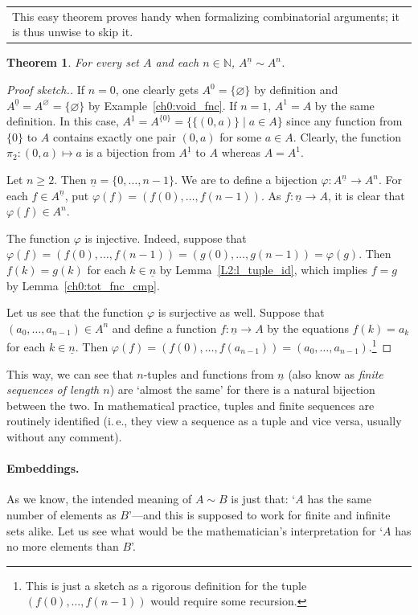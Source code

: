 \documentclass[12pt,notitlepage]{article}
\theoremstyle{plain}
\newtheorem{thm}{Theorem}[section]
\theoremstyle{definition}
\theoremstyle{plain}
\newcommand{\N}{\mathbb{N}}
\newcommand{\void}{\varnothing}
\renewcommand{\phi}{\varphi}
\newcommand{\ul}[1]{\underline{#1}}
\newcommand{\1}{\mathbf{1}}
\newcommand{\0}{\mathbf{0}}
\newcommand{\mcomm}[1]{
\medskip\noindent\begin{tabular}{| l}
\parbox{0.99\textwidth}{{\small
#1 }}\end{tabular}
\smallskip}
\begin{document}
\mcomm{This easy theorem proves handy when formalizing combinatorial arguments; it is thus unwise to skip it.}
\begin{thm}\label{L9:t_tuples}
For every set $A$ and each $n \in \N$, $A^{\ul{n}} \sim A^n$.
\end{thm}
\begin{proof}[Proof sketch.]
If $n = 0$, one clearly gets $A^0 = \{ \void \}$ by definition and $A^{\ul{0}} = A^\void = \{ \void \}$ by Example~\ref{ch0:void_fnc}. If $n = 1$, $A^1 = A$ by the same definition. In this case, $A^{\ul{1}} = A^{\{0\}} = \{ \{ (0, a) \} \mid a \in A\}$ since any function from $\{ 0 \}$ to $A$ contains exactly one pair $(0, a)$ for some $a \in A$. Clearly, the function $\pi_2 \colon (0, a) \mapsto a$ is a bijection from $A^{\ul{1}}$ to $A$ whereas $A = A^1$.

Let $n \ge 2$. Then $\ul{n} = \{0, \ldots, n-1 \}$. We are to define a bijection $\phi \colon A^{\ul{n}} \to A^n$. For each $f \in A^{\ul{n}}$, put $\phi(f) = (f(0), \ldots, f(n - 1))$. As $f\colon \ul{n} \to A$, it is clear that $\phi(f) \in A^n$. 

The function $\phi$ is injective. Indeed, suppose that $\phi(f) = (f(0), \ldots, f(n - 1)) = (g(0), \ldots, g(n - 1)) = \phi(g)$. Then $f(k) = g(k)$ for each $k \in \ul{n}$ by Lemma~\ref{L2:l_tuple_id}, which implies $f = g$ by Lemma~\ref{ch0:tot_fnc_cmp}.

Let us see that the function $\phi$ is surjective as well. Suppose that $(a_0, \ldots, a_{n-1}) \in A^n$ and define a function $f\colon \ul{n} \to A$ by the equations $f(k) = a_k$ for each $k \in \ul{n}$. Then $\phi(f) = (f(0), \ldots, f(a_{n-1})) = (a_0, \ldots, a_{n-1})$.\footnote{This is just a sketch as a rigorous definition for the tuple $(f(0),\ldots,f(n-1))$ would require some recursion.}
\end{proof}

This way, we can see that $n$-tuples and functions from $\ul{n}$ (also know as \emph{finite sequences of length $n$}) are `almost the same' for there is a natural bijection between the two. In mathematical practice, tuples and finite sequences are routinely identified (i.\,e., they view a sequence as a tuple and vice versa, usually without any comment).

\paragraph{Embeddings.} As we know, the intended meaning of $A \sim B$ is just that: `$A$ has the same number of elements as $B$'---and this is supposed to work for finite and infinite sets alike. Let us see what would be the mathematician's interpretation for `$A$ has no more elements than $B$'.
\end{document}
